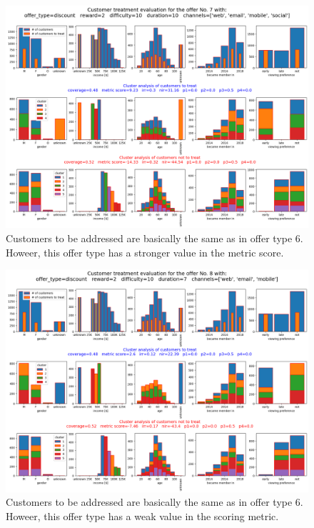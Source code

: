 \documentclass[11pt]{article} %
\begin{document}
\begin{figure}[H]
\includegraphics[height=0.5\textheight]{results/results7.png}
\caption{Customers to be addressed are basically the same as in offer type 6. Howeer, this offer type has a stronger value in the metric score.}
\end{figure}
\begin{figure}[H]
\includegraphics[height=0.5\textheight]{results/results8.png}
\caption{Customers to be addressed are basically the same as in offer type 6. Howeer, this offer type has a weak value in the scoring metric. }
\end{figure}
\end{document}

